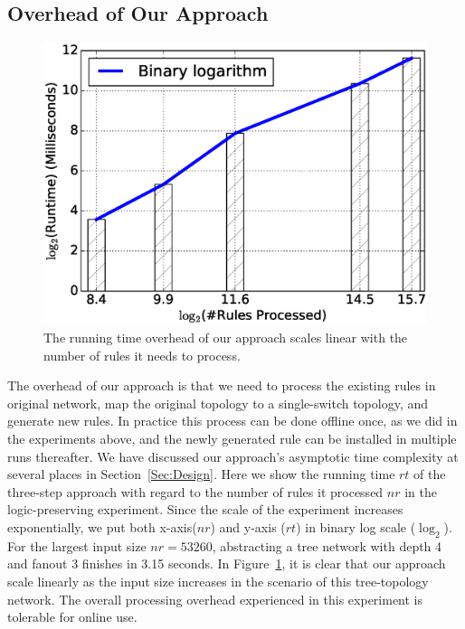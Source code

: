 \subsection{Overhead of Our Approach}

\begin{figure}[h]
\centering
\includegraphics[scale=.42]{figures/bs_overhead.eps}
\caption{The running time overhead of our approach scales linear with the number of
        rules it needs to process.}
\label{Fig:BSOverhead}
\end{figure}

The overhead of our approach is that we need to process the existing rules in original network,
map the original topology to a single-switch topology, and
generate new rules.
In practice this process can be done offline once, as we did in the experiments above,
and the newly generated rule can be installed in multiple runs thereafter.
We have discussed our approach's asymptotic time complexity at several places in Section~\ref{Sec:Design}.
Here we show the running time $rt$ of the three-step approach with regard to
the number of rules it processed $nr$ in the logic-preserving experiment.
Since the scale of the experiment increases exponentially, we put both x-axis($nr$)
and y-axis ($rt$) in binary log scale ($\log_2$).
For the largest input size $nr=53260$, abstracting a tree network with depth 4 and
fanout 3 finishes in 3.15 seconds.
In Figure~\ref{Fig:BSOverhead}, it is clear that our approach scale linearly as the
input size increases in the scenario of this tree-topology network.
The overall processing overhead experienced in this experiment is tolerable for online use.

